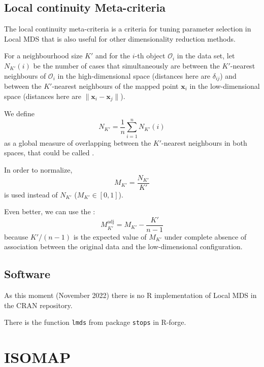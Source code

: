\subsection{Local continuity Meta-criteria}

The local continuity meta-criteria is a criteria for tuning parameter
selection in Local MDS that is also useful for other
dimensionality reduction methods.

For a neighbourhood size $K'$ and for the $i$-th object $\mathcal O_i$ in the
data set, let $N_{K'}(i)$ be the number of cases that simultaneously are between
the $K'$-nearest neighbours of $\mathcal O_i$ in the high-dimensional space
(distances here are $\delta_{ij}$) and between the $K'$-nearest neighbours of
the mapped point $\boldsymbol x_i$ in the low-dimensional space (distances here
are $\lVert \boldsymbol x_i - \boldsymbol x_j \rVert$).

We define
\begin{equation*}
	N_{K'} = \frac{1}{n} \sum_{i=1}^n N_{K'}(i)
\end{equation*}
as a global measure of overlapping between the $K'$-nearest neighbours in
both spaces, that could be called .

In order to normalize,
\begin{equation*}
	M_{K'} = \frac{N_{K'}}{K'}
\end{equation*}
is used instead of $N_{K'}$ ($M_{K'} \in [0, 1]$).

Even better, we can use the :
\begin{equation*}
	M_{K'}^{\text{adj}} = M_{K'} - \frac{K'}{n - 1}
\end{equation*}
because $K'/(n-1)$ is the expected value of $M_{K'}$ under complete
absence of association between the original data and the low-dimensional
configuration.

\subsection{Software}

As this moment (November 2022) there is no R implementation of Local MDS
in the CRAN repository.

There is the function \texttt{lmds} from package \texttt{stops} in R-forge.


\pagebreak
\section{ISOMAP}

